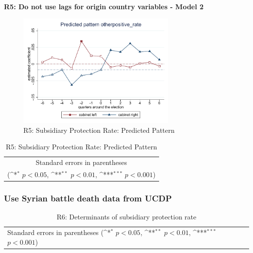 \documentclass[10pt,a4paper]{scrartcl}
\begin{document}
\clearpage
\textbf{R5: Do not use lags for origin country variables - Model 2}
\begin{figure}[!ht]
	\centering
	\includegraphics[width=0.7\textwidth]{figures_edited/otherpositive_rate_graph2_R5.pdf}
	\caption{R5: Subsidiary Protection Rate: Predicted Pattern}
\end{figure}

\begin{table}[!ht]\centering
	\footnotesize
	\renewcommand{\arraystretch}{1.2}
	\def\sym#1{\ifmmode^{#1}\else\(^{#1}\)\fi}
	\caption{R5: Subsidiary Protection Rate: Predicted Pattern}
	\begin{tabular}{l*{2}{c}}
		\hline\hline
		
		\hline\hline
		\multicolumn{3}{c}{\footnotesize Standard errors in parentheses} \\
		\multicolumn{3}{c}{\footnotesize (\sym{*} \(p<0.05\), \sym{**} \(p<0.01\), \sym{***} \(p<0.001\))} \\
	\end{tabular}
\end{table}




\clearpage
\FloatBarrier
\subsubsection{Use Syrian battle death data from UCDP}
\begin{table}[!ht]\centering
	\renewcommand{\arraystretch}{1.25}
	\small
	\def\sym#1{\ifmmode^{#1}\else\(^{#1}\)\fi}
	\caption{R6: Determinants of subsidiary protection rate}
	\begin{tabular}{l*{3}{c}}
		\hline\hline
		
		\hline\hline
		\multicolumn{4}{l}{\footnotesize Standard errors in parentheses (\sym{*} \(p<0.05\), \sym{**} \(p<0.01\), \sym{***} \(p<0.001\))}\\
	\end{tabular}
\end{table}
\end{document}
